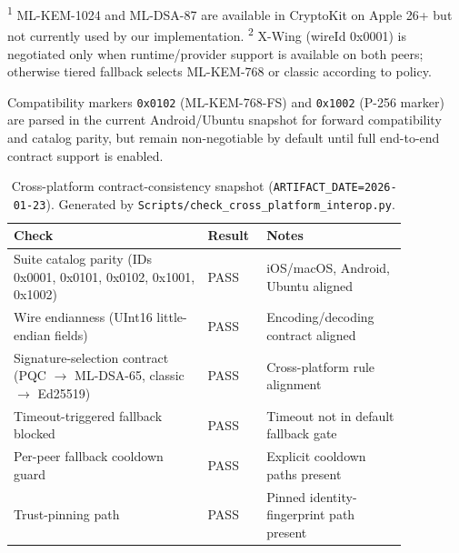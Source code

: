 \documentclass[10pt,journal,compsoc]{IEEEtran}
\begin{document}
\textsuperscript{1} ML-KEM-1024 and ML-DSA-87 are available in CryptoKit
on Apple 26+ but not currently used by our implementation.
\textsuperscript{2} X-Wing (wireId 0x0001) is negotiated only when
runtime/provider support is available on both peers; otherwise tiered
fallback selects ML-KEM-768 or classic according to policy.

Compatibility markers \texttt{0x0102} (ML-KEM-768-FS) and \texttt{0x1002}
(P-256 marker) are parsed in the current Android/Ubuntu snapshot for
forward compatibility and catalog parity, but remain non-negotiable by
default until full end-to-end contract support is enabled.

\begin{table}[!tp]
\centering
\scriptsize
\caption{Cross-platform contract-consistency snapshot (\texttt{ARTIFACT\_DATE=2026-01-23}). Generated by \texttt{Scripts/check\_cross\_platform\_interop.py}.}
\label{tab:supp-cross-platform-contract}
\begin{tabular}{@{}>{\raggedright\arraybackslash}p{0.44\linewidth}>{\centering\arraybackslash}p{0.10\linewidth}>{\raggedright\arraybackslash}p{0.32\linewidth}@{}}
\toprule
Check & Result & Notes \\
\midrule
Suite catalog parity (IDs 0x0001, 0x0101, 0x0102, 0x1001, 0x1002) & PASS & iOS/macOS, Android, Ubuntu aligned \\
Wire endianness (UInt16 little-endian fields) & PASS & Encoding/decoding contract aligned \\
Signature-selection contract (PQC $\rightarrow$ ML-DSA-65, classic $\rightarrow$ Ed25519) & PASS & Cross-platform rule alignment \\
Timeout-triggered fallback blocked & PASS & Timeout not in default fallback gate \\
Per-peer fallback cooldown guard & PASS & Explicit cooldown paths present \\
Trust-pinning path & PASS & Pinned identity-fingerprint path present \\
\bottomrule
\end{tabular}
\end{table}
\end{document}
